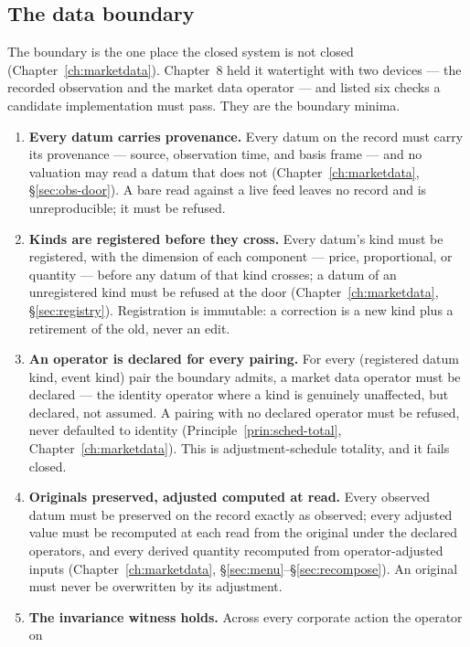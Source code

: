 \subsection{The data boundary}

The boundary is the one place the closed system is not closed
(Chapter~\ref{ch:marketdata}). Chapter~8 held it watertight with two devices --- the
recorded observation and the market data operator --- and listed six checks a candidate
implementation must pass. They are the boundary minima.

\begin{enumerate}[label=\textbf{B\arabic*.}, ref=B\arabic*, leftmargin=*, itemsep=3pt]
\item \textbf{Every datum carries provenance.} Every datum on the record must carry its
  provenance --- source, observation time, and basis frame --- and no valuation may read a
  datum that does not (Chapter~\ref{ch:marketdata}, \S\ref{sec:obs-door}). A bare read
  against a live feed leaves no record and is unreproducible; it must be refused.
\item \textbf{Kinds are registered before they cross.} Every datum's kind must be
  registered, with the dimension of each component --- price, proportional, or quantity ---
  before any datum of that kind crosses; a datum of an unregistered kind must be refused at
  the door (Chapter~\ref{ch:marketdata}, \S\ref{sec:registry}). Registration is immutable:
  a correction is a new kind plus a retirement of the old, never an edit.
\item \textbf{An operator is declared for every pairing.} For every (registered datum kind,
  event kind) pair the boundary admits, a market data operator must be declared --- the
  identity operator where a kind is genuinely unaffected, but declared, not assumed. A
  pairing with no declared operator must be refused, never defaulted to identity
  (Principle~\ref{prin:sched-total}, Chapter~\ref{ch:marketdata}). This is
  adjustment-schedule totality, and it fails closed.
\item \textbf{Originals preserved, adjusted computed at read.} Every observed datum must be
  preserved on the record exactly as observed; every adjusted value must be recomputed at
  each read from the original under the declared operators, and every derived quantity
  recomputed from operator-adjusted inputs
  (Chapter~\ref{ch:marketdata}, \S\ref{sec:menu}--\S\ref{sec:recompose}). An original must
  never be overwritten by its adjustment.
\item \textbf{The invariance witness holds.} Across every corporate action the operator on

\end{enumerate}
